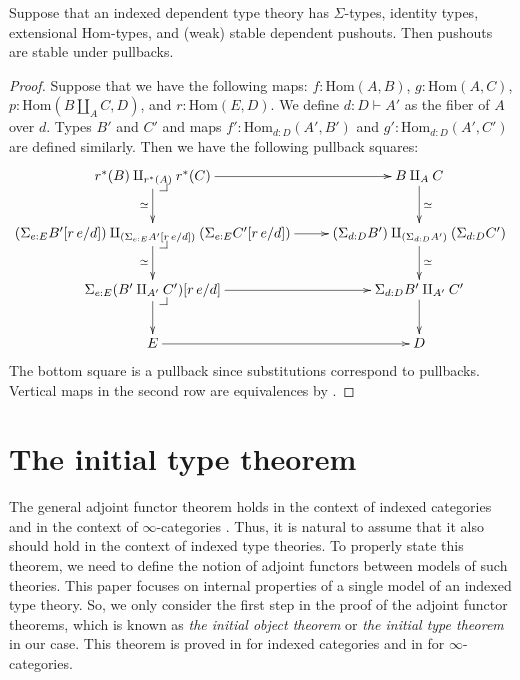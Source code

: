 \documentclass[reqno]{mscs}
\makeatletter
\newcommand{\ob}{}
\newcommand{\fs}[1]{\mathrm{#1}}
\newcommand{\Hom}{\fs{Hom}}
\numberwithin{figure}{section}
\newcommand{\pb}[1][dr]{\save*!/#1-1.2pc/#1:(-1,1)@^{|-}\restore}
\makeatother
\begin{document}
\begin{prop}
Suppose that an indexed dependent type theory has $\Sigma$-types, identity types, extensional $\Hom$-types, and (weak) stable dependent pushouts.
Then pushouts are stable under pullbacks.
\end{prop}
\begin{proof}
Suppose that we have the following maps: $f : \Hom(A,B)$, $g : \Hom(A,C)$, $p : \Hom(B \amalg_A C, D)$, and $r : \Hom(E,D)$.
We define $d : D \vdash A' \ob$ as the fiber of $A$ over $d$.
Types $B'$ and $C'$ and maps $f' : \Hom_{d : D}(A',B')$ and $g' : \Hom_{d : D}(A',C')$ are defined similarly.
Then we have the following pullback squares:
\[ \xymatrix{ r^*(B) \amalg_{r^*(A)} r^*(C) \ar[r] \ar[d]_\simeq \pb & B \amalg_A C \ar[d]^\simeq \\
              (\Sigma_{e : E} B'[r\,e/d]) \amalg_{(\Sigma_{e : E} A'[r\,e/d])} (\Sigma_{e : E} C'[r\,e/d]) \ar[r] \ar[d]_\simeq \pb & (\Sigma_{d : D} B') \amalg_{(\Sigma_{d : D} A')} (\Sigma_{d : D} C') \ar[d]^\simeq \\
              \Sigma_{e : E} (B' \amalg_{A'} C')[r\,e/d] \ar[r] \ar[d] \pb & \Sigma_{d : D} B' \amalg_{A'} C' \ar[d] \\
              E \ar[r] & D
            } \]
The bottom square is a pullback since substitutions correspond to pullbacks.
Vertical maps in the second row are equivalences by .
\end{proof}

\section{The initial type theorem}
\label{sec:initial}

The general adjoint functor theorem holds in the context of indexed categories \cite[IV.1]{indexed-cats} and in the context of $\infty$-categories \cite{infty-gaft}.
Thus, it is natural to assume that it also should hold in the context of indexed type theories.
To properly state this theorem, we need to define the notion of adjoint functors between models of such theories.
This paper focuses on internal properties of a single model of an indexed type theory.
So, we only consider the first step in the proof of the adjoint functor theorems, which is known as \emph{the initial object theorem} or \emph{the initial type theorem} in our case.
This theorem is proved in \cite[IV.1.1]{indexed-cats} for indexed categories and in \cite[Proposition~2.3.2]{infty-gaft} for $\infty$-categories.
\end{document}
